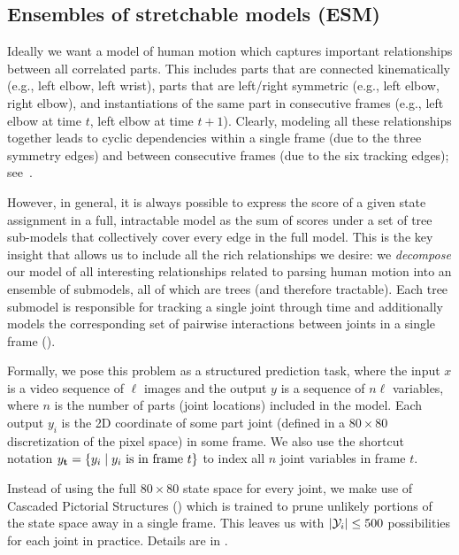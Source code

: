 \subsection{Ensembles of stretchable models (ESM)}
Ideally we want a model of human motion which captures important
relationships between all correlated parts.  This includes parts that
are connected kinematically (e.g., left elbow, left wrist), parts that
are left/right symmetric (e.g., left elbow, right elbow), and
instantiations of the same part in consecutive frames (e.g., left
elbow at time $t$, left elbow at time $t+1$).  Clearly, modeling all
these relationships together leads to cyclic dependencies
within a single frame (due to the three symmetry edges) and
between consecutive frames (due to the six tracking edges); 
see~. 

However, in general, it is always possible to express the score of a
given state assignment in a full, intractable model as the sum of
scores under a set of tree sub-models that collectively cover every
edge in the full model. This is the key insight that allows us to
include all the rich relationships we desire: we {\em decompose} our
model of all interesting relationships related to parsing human motion
into an ensemble of submodels, all of which are trees (and therefore
tractable). Each tree submodel is responsible for tracking a single
joint through time and additionally models the corresponding set of
pairwise interactions between joints in a single frame
().

Formally, we pose this problem as a structured prediction task, where
the input $x$ is a video sequence of $\ell$ images and the output $y$ is a
sequence of $n\ell$ variables, where $n$ is the number of parts (joint
locations) included in the model. Each output $y_i$ is the 2D
coordinate of some part joint (defined in a $80 \times 80$
discretization of the pixel space) in some frame.  We also use the shortcut notation 
$y_{\bf t} = \{ y_i \;|\; y_i \text{ is in frame } t \}$
to index all $n$ joint variables in frame $t$.  

Instead of using the full $80 \times 80$ state space for every joint, we make 
use of Cascaded Pictorial Structures () which is trained to prune 
unlikely portions of the state space away in a single frame.  This leaves us 
with $|\mathcal{Y}_i| \leq 500$ possibilities for each joint in practice.  Details are 
in .



